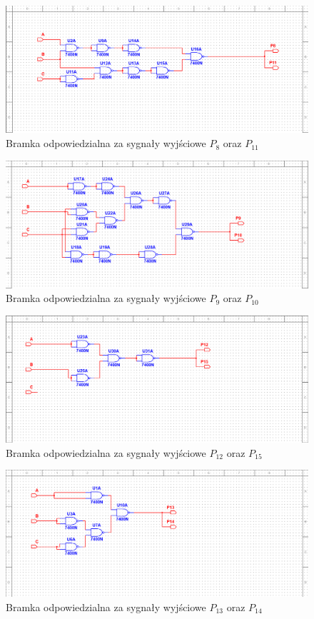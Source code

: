 \documentclass[11pt]{article}
\begin{document}
\begin{figure}[H]
\centering
\includegraphics[width=.9\linewidth]{p8p11m.png}
\caption{Bramka odpowiedzialna za sygnały wyjściowe \(P_8\) oraz \(P_{11}\)}
\end{figure}

\begin{figure}[H]
\centering
\includegraphics[width=.9\linewidth]{p9p10m.png}
\caption{Bramka odpowiedzialna za sygnały wyjściowe \(P_9\) oraz \(P_{10}\)}
\end{figure}

\begin{figure}[H]
\centering
\includegraphics[width=.9\linewidth]{p12p15m.png}
\caption{Bramka odpowiedzialna za sygnały wyjściowe \(P_{12}\) oraz \(P_{15}\)}
\end{figure}

\begin{figure}[H]
\centering
\includegraphics[width=.9\linewidth]{p13p14m.png}
\caption{Bramka odpowiedzialna za sygnały wyjściowe \(P_{13}\) oraz \(P_{14}\)}
\end{figure}
\end{document}
